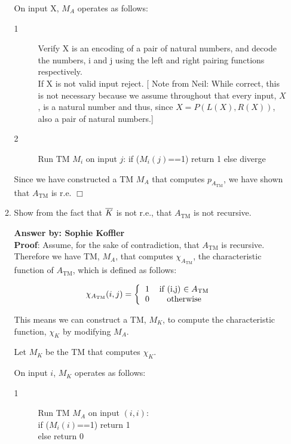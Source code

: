 \documentclass[12pt]{article}
\begin{document}
\begin{enumerate}
\begin{enumerate}
         On input X, $M_{A}$ operates as follows:
         \begin{description}
         	\item[1] Verify X is an encoding of a pair of natural numbers, and decode the numbers, i and j using the left and right pairing functions respectively. 
         	\\If X is not valid input reject.  [{\color{blue} Note from Neil: While correct, this is not
                necessary because we assume throughout that every input, $X$, is a natural number
                and thus, since $X = P(L(X),R(X))$, also a pair of natural numbers.}]
         	\item[2] Run TM $M_{i}$ on input $j$:
			         	if ($M_{i}(j)$==1) return 1
			         	else diverge
         \end{description}
        Since we have constructed a TM $M_{A}$ that computes $p_{A_{\text{TM}}}$, we have shown that $A_{\text{TM}}$ is r.e. $\Box$ 
         
   \item Show from the fact that $\overline{K}$ is not r.e., that $A_{\text{TM}}$ is not recursive.  
   
{\bf Answer by: Sophie Koffler} \\

     \textbf{Proof}: Assume, for the sake of contradiction, that $A_{\text{TM}}$ is recursive.  Therefore we have TM, $M_{A}$, that
     computes $\chi_{A_{\text{TM}}}$, the characteristic function of $A_{\text{TM}}$, which is defined as follows: 
      \begin{center}	 
       	\[ \chi_{A_{\text{TM}}}(i,j) = 
       	\left \{
       	\begin{tabular}{cc}
       	1 & if (i,j) $\in A_{\text{TM}}$  \\
       	0 & otherwise \\
       	\end{tabular}
       	\right.
       	\]
       \end{center}
       
       This means we can construct a TM, $M_{{K}}$, to compute the characteristic function, $\chi_{{K}}$ by modifying $M_{A}$.
       
       Let $M_{{K}}$ be the TM that computes $\chi_{{K}}$.
       
       On input $i$, $M_{{K}}$ operates as follows:
       \begin{description}
       	\item[1] Run TM $M_A$ on input $(i,i)$:
       	\\if ($M_{i}(i)$==1) return 1
       	\\else return 0
       \end{description}
       

\end{enumerate}
\end{enumerate}
\end{document}

